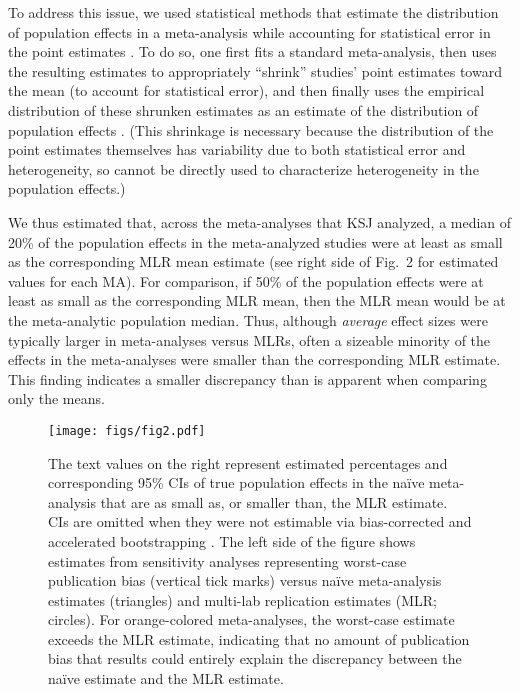 \documentclass[man,floatsintext]{apa7}
\begin{document}
To address this issue, we used statistical methods that estimate the distribution of population effects in a meta-analysis while accounting for statistical error in the point estimates \parencite{mathur2020robust,mathur2019new}. To do so, one first fits a standard meta-analysis, then uses the resulting estimates to appropriately ``shrink'' studies' point estimates toward the mean (to account for statistical error), and then finally uses the empirical distribution of these shrunken estimates as an estimate of the distribution of population effects \parencite{mathur2020robust,mathur2019new,MetaUtility}. (This shrinkage is necessary because the distribution of the point estimates themselves has variability due to both statistical error and heterogeneity, so cannot be directly used to characterize heterogeneity in the population effects.)


We thus estimated that, across the meta-analyses that KSJ analyzed, a median of 20\% of the population effects in the meta-analyzed studies were at least as small as the corresponding MLR mean estimate (see right side of Fig.\ 2 for estimated values for each MA). For comparison, if 50\% of the population effects were at least as small as the corresponding MLR mean, then the MLR mean would be at the meta-analytic population median. Thus, although \emph{average} effect sizes were typically larger in meta-analyses versus MLRs, often a sizeable minority of the effects in the meta-analyses were smaller than the corresponding MLR estimate. This finding indicates a smaller discrepancy than is apparent when comparing only the means. 

\begin{figure}[ht]
\centering
     \texttt{[image: figs/fig2.pdf]}
      \caption{The text values on the right represent estimated percentages and corresponding 95\% CIs of true population effects in the naïve meta-analysis that are as small as, or smaller than, the MLR estimate. CIs are omitted when they were not estimable via bias-corrected and accelerated bootstrapping \parencite{mathur2020robust}. The left side of the figure shows estimates from sensitivity analyses representing worst-case publication bias (vertical tick marks) versus na\"ive meta-analysis estimates (triangles) and multi-lab replication estimates (MLR; circles). For orange-colored meta-analyses, the worst-case estimate exceeds the MLR estimate, indicating that no amount of publication bias that results could entirely explain the discrepancy between the naïve estimate and the MLR estimate. }
\end{figure}
\end{document}

